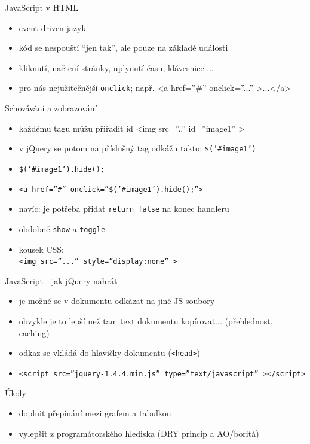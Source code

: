 \documentclass{beamer}
\begin{document}
\begin{frame}{JavaScript v HTML}
  \begin{itemize}
    \item event-driven jazyk
    \item kód se nespouští ``jen tak'', ale pouze na základě události
    \item kliknutí, načtení stránky, uplynutí času, klávesnice ...
    \item pro nás nejužitečnější \texttt{onclick}; např. <a href=''\#'' onclick=''...'' >...</a>
  \end{itemize}
\end{frame}

\begin{frame}{Schovávání a zobrazování}
  \begin{itemize}
    \item každému tagu můžu přiřadit id <img src=''..'' id=''image1'' >
    \item v jQuery se potom na příslušný tag odkážu takto: \texttt{\$('\#image1')}
    \item \texttt{\$('\#image1').hide();}
    \item \texttt{<a href=''\#'' onclick=''\$('\#image1').hide();''>}
    \item navíc: je potřeba přidat \texttt{return false} na konec handleru
    \item obdobně \texttt{show} a \texttt{toggle}
    \item kousek CSS: \\ \texttt{<img src=''...'' style=''display:none'' >}
  \end{itemize}
\end{frame}

\begin{frame}{JavaScript - jak jQuery nahrát}
  \begin{itemize}
    \item je možné se v dokumentu odkázat na jiné JS soubory
    \item obvykle je to lepší než tam text dokumentu kopírovat... (přehlednost, caching)
    \item odkaz se vkládá do hlavičky dokumentu (\texttt{<head>})
    \item \texttt{<script src=''jquery-1.4.4.min.js'' type=''text/javascript'' ></script>}
  \end{itemize}
\end{frame}

\begin{frame}{Úkoly}
  \begin{itemize}
    \item doplnit přepínání mezi grafem a tabulkou
    \item vylepšit z programátorského hlediska (DRY princip a AO/boritá)
  \end{itemize}
\end{frame}
\end{document}
